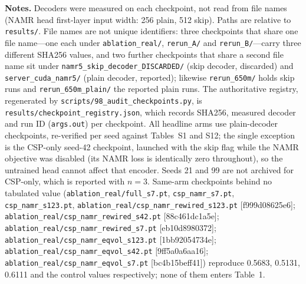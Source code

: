 \documentclass[11pt,a4paper]{article}
\begin{document}
\begin{table}[h]
\centering
\caption{\textbf{Paper arm names mapped to the released checkpoint files, with file hashes and the decoder each checkpoint actually contains.}}

\smallskip
{\footnotesize \noindent \textbf{Notes.} Decoders were measured on each checkpoint, not read from file names (NAMR head first-layer input width: 256 plain, 512 skip). Paths are relative to \texttt{results/}. File names are not unique identifiers: three checkpoints that share one file name---one each under \texttt{ablation\_\allowbreak real/}, \texttt{rerun\_A/} and \texttt{rerun\_B/}---carry three different SHA256 values, and two further checkpoints that share a second file name sit under \texttt{namr5\_\allowbreak skip\_\allowbreak decoder\_\allowbreak DISCARDED/} (skip decoder, discarded) and \texttt{server\_\allowbreak cuda\_\allowbreak namr5/} (plain decoder, reported); likewise \texttt{rerun\_\allowbreak 650m/} holds skip runs and \texttt{rerun\_\allowbreak 650m\_\allowbreak plain/} the reported plain runs. The authoritative registry, regenerated by \texttt{scripts/98\_\allowbreak audit\_\allowbreak checkpoints.\allowbreak py}, is \texttt{results/checkpoint\_\allowbreak registry.\allowbreak json}, which records SHA256, measured decoder and run ID (\texttt{args.out}) per checkpoint. All headline arms use plain-decoder checkpoints, re-verified per seed against Tables~S1 and S12; the single exception is the CSP-only seed-42 checkpoint, launched with the skip flag while the NAMR objective was disabled (its NAMR loss is identically zero throughout), so the untrained head cannot affect that encoder. Seeds 21 and 99 are not archived for CSP-only, which is reported with $n=3$. Same-arm checkpoints behind no tabulated value (\texttt{ablation\_\allowbreak real/full\_\allowbreak s7.\allowbreak pt}, \texttt{csp\_\allowbreak namr\_\allowbreak s7.\allowbreak pt}, \texttt{csp\_\allowbreak namr\_\allowbreak s123.\allowbreak pt}, \texttt{ablation\_\allowbreak real/csp\_\allowbreak namr\_\allowbreak rewired\_\allowbreak s123.\allowbreak pt} [f999d08625e6]; \texttt{ablation\_\allowbreak real/csp\_\allowbreak namr\_\allowbreak rewired\_\allowbreak s42.\allowbreak pt} [88c461dc1a5e]; \texttt{ablation\_\allowbreak real/csp\_\allowbreak namr\_\allowbreak rewired\_\allowbreak s7.\allowbreak pt} [eb10d8980372]; \texttt{ablation\_\allowbreak real/csp\_\allowbreak namr\_\allowbreak eqvol\_\allowbreak s123.\allowbreak pt} [1bb92054734e]; \texttt{ablation\_\allowbreak real/csp\_\allowbreak namr\_\allowbreak eqvol\_\allowbreak s42.\allowbreak pt} [9ff5a0a6aa16]; \texttt{ablation\_\allowbreak real/csp\_\allowbreak namr\_\allowbreak eqvol\_\allowbreak s7.\allowbreak pt} [bc4b15beff41]) reproduce 0.5683, 0.5131, 0.6111 and the control values respectively; none of them enters Table~1.}


\end{table}
\end{document}
